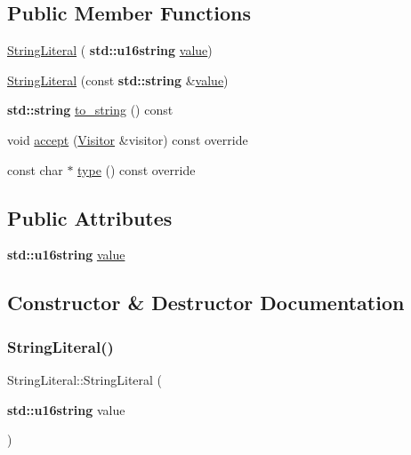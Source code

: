 \subsection*{Public Member Functions}
\begin{DoxyCompactItemize}
\item 
\hyperlink{struct_string_literal_a16fe773d6f41326c1ea714a58031e405}{String\+Literal} (\textbf{ std\+::u16string} \hyperlink{struct_string_literal_a6e41d06a20217417a1bf70171235a711}{value})
\item 
\hyperlink{struct_string_literal_a6a2c7a273d6e9db9118a97428777746f}{String\+Literal} (const \textbf{ std\+::string} \&\hyperlink{struct_string_literal_a6e41d06a20217417a1bf70171235a711}{value})
\item 
\textbf{ std\+::string} \hyperlink{struct_string_literal_a4ce38106ec30d1c68c505c4d5080e236}{to\+\_\+string} () const
\item 
void \hyperlink{struct_string_literal_a796470cf5573384c12d62520728dea26}{accept} (\hyperlink{struct_visitor}{Visitor} \&visitor) const override
\item 
const char $\ast$ \hyperlink{struct_string_literal_ad9f83f67d287ea9d871a39672a3e64a9}{type} () const override
\end{DoxyCompactItemize}
\subsection*{Public Attributes}
\begin{DoxyCompactItemize}
\item 
\textbf{ std\+::u16string} \hyperlink{struct_string_literal_a6e41d06a20217417a1bf70171235a711}{value}
\end{DoxyCompactItemize}


\subsection{Constructor \& Destructor Documentation}
\mbox{\label{struct_string_literal_a16fe773d6f41326c1ea714a58031e405}} 
\subsubsection{\texorpdfstring{String\+Literal()}{StringLiteral()}\hspace{0.1cm}{\footnotesize\ttfamily [1/2]}}
{\footnotesize\ttfamily String\+Literal\+::\+String\+Literal (\begin{DoxyParamCaption}\item[{\textbf{ std\+::u16string}}]{value }\end{DoxyParamCaption})\hspace{0.3cm}{\ttfamily [inline]}}

